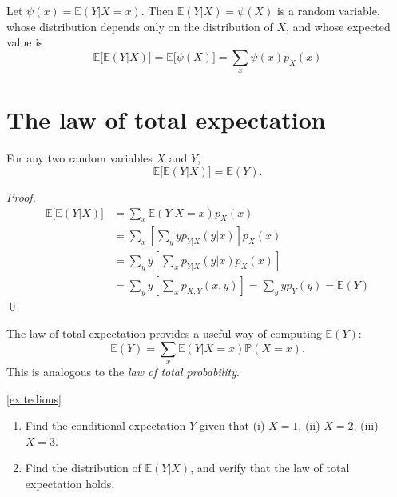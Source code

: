 \documentclass[lecture]{csm}
\newcommand{\prob}{\mathbb{P}}
\newcommand{\expe}{\mathbb{E}}
\def\it{\item}
\def\ben{\begin{enumerate}}
\def\een{\end{enumerate}}
\begin{document}
\begin{remark}
Let $\psi(x) = \expe(Y|X=x)$. Then $\expe(Y|X)=\psi(X)$ is a random variable, whose distribution depends only on the distribution of $X$, and whose expected value is
\[
\expe\big[\expe(Y|X)\big] = \expe\big[\psi(X)\big] = \sum_x \psi(x)p_X(x)
\]
\end{remark}

\section{The law of total expectation}

\begin{theorem}\label{thm:law_of_total_expectation}
For any two random variables $X$ and $Y$,
\[
\expe\big[\expe(Y|X)\big] = \expe(Y).
\]
\end{theorem}
\begin{proof}
\begin{align*}
\expe\big[\expe(Y|X)\big] 
	& = \sum_x \expe(Y|X=x) p_X(x) \\
	& = \sum_x \left[\sum_y y p_{Y|X}(y|x)\right] p_X(x) \\
	& = \sum_y y \left[\sum_x p_{Y|X}(y|x)p_X(x)\right] \\
	& = \sum_y y \left[\sum_x p_{X,Y}(x,y)\right]
	= \sum_y y p_Y(y)
	= \expe(Y)
\end{align*}
\qed
\end{proof}

\begin{remark}
The law of total expectation provides a useful way of computing $\expe(Y)$:
\[
\expe(Y) = \sum_x \expe(Y|X=x)\prob(X=x).
\]
This is analogous to the \emph{law of total probability}.
\end{remark}

\begin{examplecont}{\ref{ex:tedious}}
\ben
\it Find the conditional expectation $Y$ given that (i) $X=1$, (ii) $X=2$, (iii) $X=3$.
\it Find the distribution of $\expe(Y|X)$, and verify that the law of total expectation holds.
\een
\end{examplecont}
\end{document}
